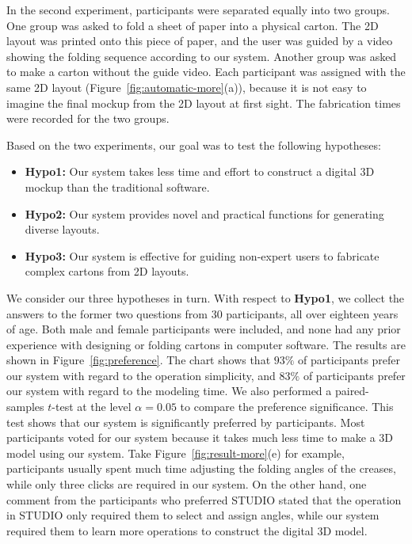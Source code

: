%
In the second experiment, participants were separated equally into two groups. One group was asked to fold a sheet of paper into a physical carton. The 2D layout was printed onto this piece of paper, and the user was guided by a video showing the folding sequence according to our system. Another group was asked to make a carton without the guide video. 
Each participant was assigned with the same 2D layout (Figure~\ref{fig:automatic-more}(a)), because it is not easy to imagine the final mockup from the 2D layout at first sight.
%
The fabrication times were recorded for the two groups.
%

Based on the two experiments, our goal was to test the following hypotheses:

\begin{itemize}
	\item \textbf{Hypo1:} Our system takes less time and effort to construct a digital 3D mockup than the traditional software.
	\item \textbf{Hypo2:} Our system provides novel and practical functions for generating diverse layouts.
	\item \textbf{Hypo3:} Our system is effective for guiding non-expert users to fabricate complex cartons from 2D layouts.
\end{itemize}




We consider our three hypotheses in turn. 
With respect to \textbf{Hypo1}, we collect the answers to the former two questions from 30 participants, all over eighteen years of age. Both male and female participants were included, and none had any prior experience with designing or folding cartons in computer software. 
%
The results are shown in Figure~\ref{fig:preference}. 
The chart shows that $93\%$ of participants prefer our system with regard to the operation simplicity, and $83\%$ of participants prefer our system with regard to the modeling time.
%
We also performed a paired-samples $t$-test at the level $\alpha = 0.05$ to compare the preference significance.
%
This test shows that our system is significantly preferred by participants.
%
Most participants voted for our system because it takes much less time to make a 3D model using our system. 
Take Figure~\ref{fig:result-more}(e) for example, participants usually spent much time adjusting the folding angles of the creases, while only three clicks are required in our system.
%
On the other hand, one comment from the participants who preferred STUDIO stated that the operation in STUDIO only required them to select and assign angles, while our system required them to learn more operations to construct the digital 3D model. 
%


